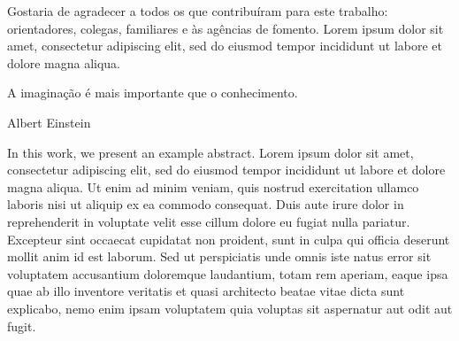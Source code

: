 \documentclass[dsc,setavermelha]{ufrj}
\theoremstyle{plain}
\theoremstyle{definition}
\theoremstyle{remark}
\begin{document}
  Gostaria de agradecer a todos os que contribuíram para este trabalho:
  orientadores, colegas, familiares e às agências de fomento. Lorem ipsum
  dolor sit amet, consectetur adipiscing elit, sed do eiusmod tempor incididunt
  ut labore et dolore magna aliqua.

  \epigraph{A imaginação é mais importante que o conhecimento.}{Albert Einstein}

  \begin{abstract}%

  Apresenta-se, nesta tese, um exemplo de resumo. Lorem ipsum dolor sit amet,
  consectetur adipiscing elit, sed do eiusmod tempor incididunt ut labore et
  dolore magna aliqua. Ut enim ad minim veniam, quis nostrud exercitation
  ullamco laboris nisi ut aliquip ex ea commodo consequat. Duis aute irure dolor
  in reprehenderit in voluptate velit esse cillum dolore eu fugiat nulla
  pariatur. Excepteur sint occaecat cupidatat non proident, sunt in culpa qui
  officia deserunt mollit anim id est laborum. Sed ut perspiciatis unde omnis
  iste natus error sit voluptatem accusantium doloremque laudantium, totam rem
  aperiam, eaque ipsa quae ab illo inventore veritatis et quasi architecto beatae
  vitae dicta sunt explicabo, nemo enim ipsam voluptatem quia voluptas sit
  aspernatur aut odit aut fugit.

  \end{abstract}

  \begin{foreignabstract}

  In this work, we present an example abstract. Lorem ipsum dolor sit amet,
  consectetur adipiscing elit, sed do eiusmod tempor incididunt ut labore et
  dolore magna aliqua. Ut enim ad minim veniam, quis nostrud exercitation
  ullamco laboris nisi ut aliquip ex ea commodo consequat. Duis aute irure dolor
  in reprehenderit in voluptate velit esse cillum dolore eu fugiat nulla
  pariatur. Excepteur sint occaecat cupidatat non proident, sunt in culpa qui
  officia deserunt mollit anim id est laborum. Sed ut perspiciatis unde omnis
  iste natus error sit voluptatem accusantium doloremque laudantium, totam rem
  aperiam, eaque ipsa quae ab illo inventore veritatis et quasi architecto beatae
  vitae dicta sunt explicabo, nemo enim ipsam voluptatem quia voluptas sit
  aspernatur aut odit aut fugit.

  \end{foreignabstract}
\end{document}
